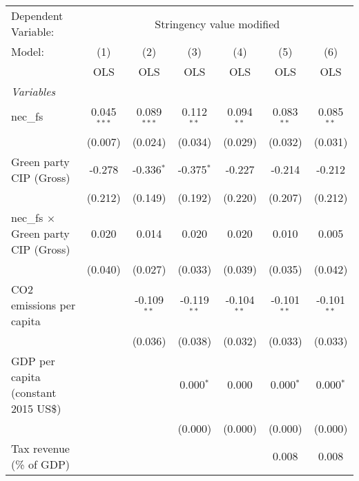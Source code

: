 
\begingroup
\centering
\begin{tabular}{lcccccc}
   \toprule
   Dependent Variable: & \multicolumn{6}{c}{Stringency value modified}\\
   Model:                                     & (1)           & (2)           & (3)           & (4)           & (5)           & (6)\\  
                                              &  OLS          & OLS           & OLS           & OLS           & OLS           & OLS\\  
   \midrule
   \emph{Variables}\\
   nec\_fs                                    & 0.045$^{***}$ & 0.089$^{***}$ & 0.112$^{**}$  & 0.094$^{**}$  & 0.083$^{**}$  & 0.085$^{**}$\\   
                                              & (0.007)       & (0.024)       & (0.034)       & (0.029)       & (0.032)       & (0.031)\\   
   Green party CIP (Gross)                    & -0.278        & -0.336$^{*}$  & -0.375$^{*}$  & -0.227        & -0.214        & -0.212\\   
                                              & (0.212)       & (0.149)       & (0.192)       & (0.220)       & (0.207)       & (0.212)\\   
   nec\_fs $\times$ Green party CIP (Gross)   & 0.020         & 0.014         & 0.020         & 0.020         & 0.010         & 0.005\\   
                                              & (0.040)       & (0.027)       & (0.033)       & (0.039)       & (0.035)       & (0.042)\\   
   CO2 emissions per capita                   &               & -0.109$^{**}$ & -0.119$^{**}$ & -0.104$^{**}$ & -0.101$^{**}$ & -0.101$^{**}$\\   
                                              &               & (0.036)       & (0.038)       & (0.032)       & (0.033)       & (0.033)\\   
   GDP per capita (constant 2015 US\$)        &               &               & 0.000$^{*}$   & 0.000         & 0.000$^{*}$   & 0.000$^{*}$\\   
                                              &               &               & (0.000)       & (0.000)       & (0.000)       & (0.000)\\   
   Tax revenue (\% of GDP)                    &               &               &               &               & 0.008         & 0.008\\   

\end{tabular}

